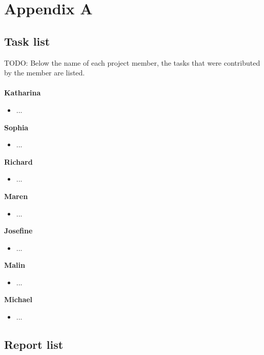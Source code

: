 
\section{Appendix A}

\subsection{Task list}

TODO: Below the name of each project member, the tasks that were contributed by the member are listed.
\\
\\
\textbf{Katharina}
\begin{itemize}
\item ...
\end{itemize}

\textbf{Sophia}
\begin{itemize}
\item ...
\end{itemize}

\textbf{Richard}
\begin{itemize}
\item ...
\end{itemize}

\textbf{Maren}
\begin{itemize}
\item ...
\end{itemize}

\textbf{Josefine}
\begin{itemize}
\item ...
\end{itemize}

\textbf{Malin}
\begin{itemize}
\item ...
\end{itemize}

\textbf{Michael}
\begin{itemize}
\item ...
\end{itemize}

\subsection{Report list}

